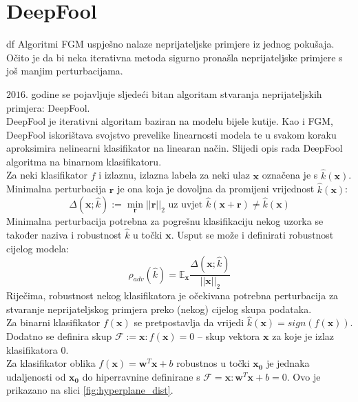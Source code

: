 \documentclass[utf8, diplomski]{fer}
\begin{document}
\section{DeepFool} df\citep{MoosaviDezfooli2016DeepFoolAS}
Algoritmi FGM uspješno nalaze neprijateljske primjere iz jednog pokušaja. Očito je da bi neka iterativna metoda sigurno pronašla neprijateljske primjere s još manjim perturbacijama.
\par
$2016.$ godine se pojavljuje sljedeći bitan algoritam stvaranja neprijateljskih primjera: DeepFool.\\
DeepFool je iterativni algoritam baziran na modelu bijele kutije. Kao i FGM, DeepFool iskorištava svojstvo prevelike linearnosti modela te u svakom koraku aproksimira nelinearni klasifikator na linearan način. Slijedi opis rada DeepFool algoritma na binarnom klasifikatoru. \\
Za neki klasifikator $f$ i izlaznu, izlazna labela za neki ulaz $\boldsymbol{x}$ označena je s $\hat{k}(\boldsymbol{x})$. Minimalna perturbacija $\boldsymbol{r}$ je ona koja je dovoljna da promijeni vrijednost $\hat{k}(\boldsymbol{x})$:
\begin{equation}
	\Delta (\boldsymbol{x}; \hat{k}) := \mathop{min}_{\boldsymbol{r}} ||\boldsymbol{r}||_{2} \text{ uz uvjet } \hat{k}(\boldsymbol{x}+\boldsymbol{r}) \neq \hat{k}(\boldsymbol{x})
\end{equation}
Minimalna perturbacija potrebna za pogrešnu klasifikaciju nekog uzorka se također naziva i robustnost $\hat{k}$ u točki $\boldsymbol{x}$. Usput se može i definirati robustnost cijelog modela:
\begin{equation}
	\rho_{adv}(\hat{k}) = \mathbb{E}_{\boldsymbol{x}} \frac{\Delta (\boldsymbol{x}; \hat{k})}{||\boldsymbol{x}||_{2}} 
\end{equation}
Riječima, robustnost nekog klasifikatora je očekivana potrebna perturbacija za stvaranje neprijateljskog primjera preko (nekog) cijelog skupa podataka. \\
Za binarni klasifikator $f(\boldsymbol{x})$ se pretpostavlja da vrijedi $\hat{k}(\boldsymbol{x}) = sign(f(\boldsymbol{x}))$. Dodatno se definira skup $\mathscr{F} :=  {\boldsymbol{x} : f(\boldsymbol{x}) = 0}$ -- skup vektora $\boldsymbol{x}$ za koje je izlaz klasifikatora $0$. \\
Za klasifikator oblika $f(\boldsymbol{x}) = \boldsymbol{w}^{T}\boldsymbol{x} + b$ robustnos u točki $\boldsymbol{x_{0}}$ je jednaka udaljenosti od $\boldsymbol{x_{0}}$ do hiperravnine definirane s $\mathscr{F} = {\boldsymbol{x} : \boldsymbol{w}^{T}\boldsymbol{x}+b=0}$. Ovo je prikazano na slici \ref{fig:hyperplane_dist}. \\
\end{document}
